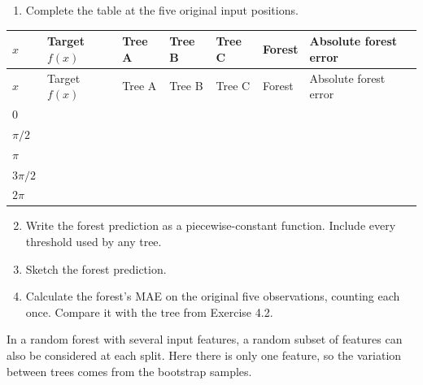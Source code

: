 \documentclass{course_sheet}
\begin{document}
\begin{enumerate}
\item
Complete the table at the five original input positions.

\end{enumerate}
\begingroup
\small
\setlength{\tabcolsep}{4pt}
\begin{longtable}{l|l|l|l|l|l|l}
$x$ & Target $f(x)$ & Tree A & Tree B & Tree C & Forest & Absolute forest error \\
\hline
\endfirsthead
$x$ & Target $f(x)$ & Tree A & Tree B & Tree C & Forest & Absolute forest error \\
\hline
\endhead
$0$ & $\phantom{0}$ & $\phantom{0}$ & $\phantom{0}$ & $\phantom{0}$ & $\phantom{0}$ & $\phantom{0}$ \\[3pt]
$\pi/2$ & $\phantom{0}$ & $\phantom{0}$ & $\phantom{0}$ & $\phantom{0}$ & $\phantom{0}$ & $\phantom{0}$ \\[3pt]
$\pi$ & $\phantom{0}$ & $\phantom{0}$ & $\phantom{0}$ & $\phantom{0}$ & $\phantom{0}$ & $\phantom{0}$ \\[3pt]
$3\pi/2$ & $\phantom{0}$ & $\phantom{0}$ & $\phantom{0}$ & $\phantom{0}$ & $\phantom{0}$ & $\phantom{0}$ \\[3pt]
$2\pi$ & $\phantom{0}$ & $\phantom{0}$ & $\phantom{0}$ & $\phantom{0}$ & $\phantom{0}$ & $\phantom{0}$ \\[3pt]
\end{longtable}
\endgroup
\begin{enumerate}
\setcounter{enumi}{1}
\item
Write the forest prediction as a piecewise-constant function. Include every threshold used by any tree.

\item
Sketch the forest prediction.

\item
Calculate the forest's MAE on the original five observations, counting each once. Compare it with the tree from Exercise 4.2.

\end{enumerate}
In a random forest with several input features, a random subset of features can also be considered at each split. Here there is only one feature, so the variation between trees comes from the bootstrap samples.

\clearpage
\end{document}
